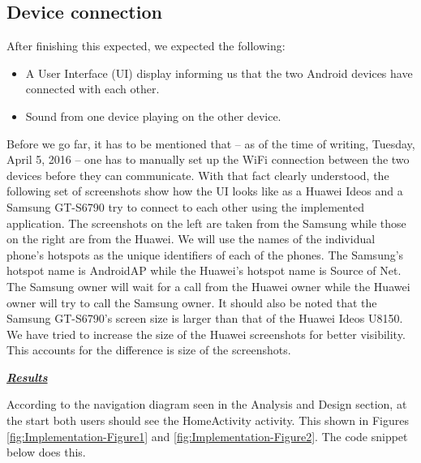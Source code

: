 \documentclass[12pt,svgnames,smaller]{article} %
\begin{document}
	\subsection{Device connection}
	
	
	After finishing this expected, we expected the following:
	
	\begin{itemize}
		\item A User Interface (UI) display informing us that the two Android devices have connected with each other.
		\item Sound from one device playing on the other device.
	\end{itemize}
	
	Before we go far, it has to be mentioned that – as of the time of writing, Tuesday, April 5, 2016 – one has to manually set up the WiFi connection between the two devices before they can communicate. With that fact clearly understood, the following set of screenshots show how the UI looks like as a Huawei Ideos and a Samsung GT-S6790 try to connect to each other using the implemented application.  The screenshots on the left are taken from the Samsung while those on the right are from the Huawei. We will use the names of the individual phone’s hotspots as the unique identifiers of each of the phones. The Samsung’s hotspot name is AndroidAP while the Huawei’s hotspot name is Source of Net. The Samsung owner will wait for a call from the Huawei owner while the Huawei owner will try to call the Samsung owner. It should also be noted that the Samsung GT-S6790’s screen size is larger than that of the Huawei Ideos U8150. We have tried to increase the size of the Huawei screenshots for better visibility. This accounts for the difference is size of the screenshots.
		
	
	\textbf{\textit{\underline{Results}}}
	
		According to the navigation diagram seen in the Analysis and Design section, at the start both users should see the HomeActivity activity. This shown in Figures \ref{fig:Implementation-Figure1} and \ref{fig:Implementation-Figure2}. The code snippet below does this.
		
\end{document}
